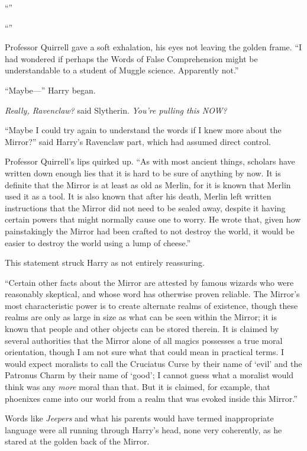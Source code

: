 “”

“”

Professor Quirrell gave a soft exhalation, his eyes not leaving the golden
frame. “I had wondered if perhaps the Words of False Comprehension might be
understandable to a student of Muggle science. Apparently not.”

“Maybe—” Harry began.

\emph{Really, Ravenclaw?} said Slytherin. \emph{You’re pulling this NOW?}

“Maybe I could try again to understand the words if I knew more about the
Mirror?” said Harry’s Ravenclaw part, which had assumed direct control.

Professor Quirrell’s lips quirked up. “As with most ancient things, scholars
have written down enough lies that it is hard to be sure of anything by now. It
is definite that the Mirror is at least as old as Merlin, for it is known that
Merlin used it as a tool. It is also known that after his death, Merlin left
written instructions that the Mirror did not need to be sealed away, despite it
having certain powers that might normally cause one to worry. He wrote that,
given how painstakingly the Mirror had been crafted to not destroy the world,
it would be easier to destroy the world using a lump of cheese.”

This statement struck Harry as not entirely reassuring.

“Certain other facts about the Mirror are attested by famous wizards who were
reasonably skeptical, and whose word has otherwise proven reliable. The
Mirror’s most characteristic power is to create alternate realms of existence,
though these realms are only as large in size as what can be seen within the
Mirror; it is known that people and other objects can be stored therein. It is
claimed by several authorities that the Mirror alone of all magics possesses a
true moral orientation, though I am not sure what that could mean in practical
terms. I would expect moralists to call the Cruciatus Curse by their name of
‘evil’ and the Patronus Charm by their name of ‘good’; I cannot guess what a
moralist would think was any \emph{more} moral than that. But it is claimed,
for example, that phoenixes came into our world from a realm that was evoked
inside this Mirror.”



Words like \emph{Jeepers} and what his parents would have termed inappropriate
language were all running through Harry’s head, none very coherently, as he
stared at the golden back of the Mirror.

